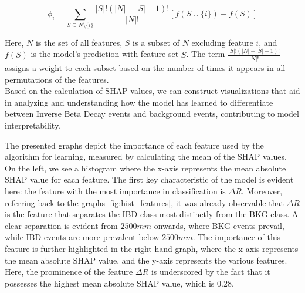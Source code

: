 \begin{equation}
	\phi_i = \sum_{S \subseteq N \setminus \{i\}} \frac{|S|!(|N| - |S| - 1)!}{|N|!} [f(S \cup \{i\}) - f(S)]
\end{equation}

Here, \(N\) is the set of all features, \(S\) is a subset of \(N\) excluding feature \(i\), and \(f(S)\) is the model's prediction with feature set \(S\). The term \(\frac{|S|!(|N| - |S| - 1)!}{|N|!}\) assigns a weight to each subset based on the number of times it appears in all permutations of the features.\\



Based on the calculation of SHAP values, we can construct visualizations that aid in analyzing and understanding how the model has learned to differentiate between Inverse Beta Decay events and background events, contributing to model interpretability. 

\begin{figure}[h!]
	\centering
	
	
\end{figure}


The presented graphs depict the importance of each feature used by the algorithm for learning, measured by calculating the mean of the SHAP values. On the left, we see a histogram where the x-axis represents the mean absolute SHAP value for each feature. The first key characteristic of the model is evident here: the feature with the most importance in classification is $\Delta R$. Moreover, referring back to the graphs \ref{fig:hist_features}, it was already observable that $\Delta R$ is the feature that separates the IBD class most distinctly from the BKG class. A clear separation is evident from $2500 mm$ onwards, where BKG events prevail, while IBD events are more prevalent below $2500 mm$. The importance of this feature is further highlighted in the right-hand graph, where the x-axis represents the mean absolute SHAP value, and the y-axis represents the various features. Here, the prominence of the feature $\Delta R$ is underscored by the fact that it possesses the highest mean absolute SHAP value, which is 0.28.  \\

